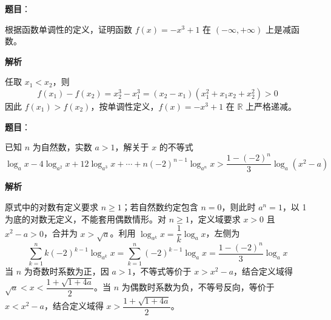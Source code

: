 \begin{answer}

\textbf{题目}：

根据函数单调性的定义，证明函数 $f(x)=-x^3+1$ 在 $(-\infty,+\infty)$ 上是减函数。

\textbf{解析}

任取 $x_1<x_2$，则
\nopagebreak[4]
\[
f(x_1)-f(x_2)=x_2^3-x_1^3
=(x_2-x_1)(x_1^2+x_1x_2+x_2^2)>0
\]
因此 $f(x_1)>f(x_2)$，按单调性定义，$f(x)=-x^3+1$ 在 $\mathbb R$ 上严格递减。


\end{answer}
\begin{answer}

\textbf{题目}：

已知 $n$ 为自然数，实数 $a>1$，解关于 $x$ 的不等式
\nopagebreak[4]
\[
\log_a x-4\log_{a^2}x+12\log_{a^3}x+\cdots+n(-2)^{n-1}\log_{a^n}x
>
\frac{1-(-2)^n}{3}\log_a(x^2-a)
\]

\textbf{解析}

原式中的对数有定义要求 $n\ge1$；若自然数约定包含 $n=0$，则此时 $a^n=1$，以 1 为底的对数无定义，不能套用偶数情形。对 $n\ge1$，定义域要求 $x>0$ 且 $x^2-a>0$，合并为 $x>\sqrt a$。利用 $\log_{a^k}x=\dfrac1k\log_a x$，左侧为
\nopagebreak[4]
\[
\sum_{k=1}^n k(-2)^{k-1}\log_{a^k}x
=\sum_{k=1}^n(-2)^{k-1}\log_a x
=\frac{1-(-2)^n}{3}\log_a x
\]
当 $n$ 为奇数时系数为正，因 $a>1$，不等式等价于 $x>x^2-a$，结合定义域得 $\sqrt a<x<\dfrac{1+\sqrt{1+4a}}2$。当 $n$ 为偶数时系数为负，不等号反向，等价于 $x<x^2-a$，结合定义域得 $x>\dfrac{1+\sqrt{1+4a}}2$。


\end{answer}
